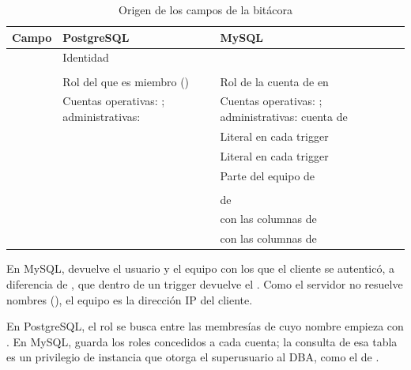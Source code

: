 \begin{table}[H]
	\centering
	\small
	\caption{Origen de los campos de la bitácora}
	\label{tab:bitacora-campos}
	\begin{tabular}{@{}L{4.2cm} L{5.6cm} L{6.2cm}@{}}
		\toprule
		\textbf{Campo} & \textbf{PostgreSQL} & \textbf{MySQL} \\
		\midrule
		 & Identidad &  \\
		 &  &  \\
		 & Rol del que  es miembro () & Rol de la cuenta de  en  \\
		 & Cuentas operativas: ; administrativas:  & Cuentas operativas: ; administrativas: cuenta de  \\
		 &  & Literal en cada trigger \\
		 &  & Literal en cada trigger \\
		 &  & Parte del equipo de  \\
		 &  &  \\
		 &  &  de  \\
		 &  &  con las columnas de  \\
		 &  &  con las columnas de  \\
		\bottomrule
	\end{tabular}
\end{table}

En MySQL,  devuelve el usuario y el equipo con los que el cliente se autenticó, a diferencia de , que dentro de un trigger devuelve el . Como el servidor no resuelve nombres (), el equipo es la dirección IP del cliente.

En PostgreSQL, el rol se busca entre las membresías de  cuyo nombre empieza con . En MySQL,  guarda los roles concedidos a cada cuenta; la consulta de esa tabla es un privilegio de instancia que otorga el superusuario al DBA, como el de .

